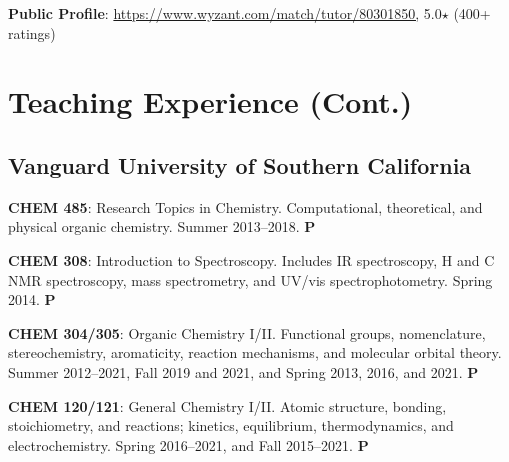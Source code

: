 \documentclass[11pt]{article}
\newcommand{\teitem}[4]{\textbf{#1}: #2 #3 \textbf{#4}}
\begin{document}
\teitem{Public Profile}{\href{https://www.wyzant.com/match/tutor/80301850}{https://www.wyzant.com/match/tutor/80301850,}}{5.0$\star$ (400+ ratings)}{}


\section{Teaching Experience (Cont.)}


\subsection*{Vanguard University of Southern California}


\teitem{CHEM 485}{Research Topics in Chemistry. Computational, theoretical, and physical organic chemistry.}{Summer 2013--2018.}{P}


\teitem{CHEM 308}{Introduction to Spectroscopy. Includes IR spectroscopy, \raisebox{1mm}{\scriptsize 1}H and \raisebox{1mm}{\scriptsize 13}C NMR spectroscopy, mass spectrometry, and UV/vis spectrophotometry.}{Spring 2014.}{P}

\teitem{CHEM 304/305}{Organic Chemistry I/II. Functional groups, nomenclature, stereochemistry, aromaticity, reaction mechanisms, and molecular orbital theory.}{Summer 2012--2021, Fall 2019 and 2021, and Spring 2013, 2016, and 2021.}{P} 

\teitem{CHEM 120/121}{General Chemistry I/II. Atomic structure, bonding, stoichiometry, and reactions; kinetics, equilibrium, thermodynamics, and electrochemistry.}{Spring 2016--2021, and Fall 2015--2021.}{P}
\end{document}

